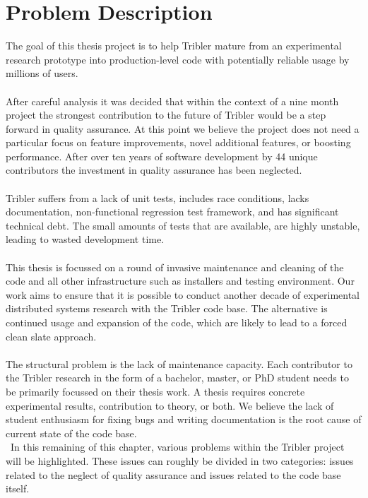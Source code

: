 \chapter{Problem Description}

The goal of this thesis project is to help Tribler mature from an experimental research prototype into production-level code with potentially reliable usage by millions of users.\\\\
After careful analysis it was decided that within the context of a nine month project the strongest contribution to the future of Tribler would be a step forward in quality assurance. At this point we believe the project does not need a particular focus on feature improvements, novel additional features, or boosting performance. After over ten years of software development by 44 unique contributors the investment in quality assurance has been neglected.\\\\
Tribler suffers from a lack of unit tests, includes race conditions, lacks documentation, non-functional regression test framework, and has significant technical debt. The small amounts of tests that are available, are highly unstable, leading to wasted development time.\\\\
This thesis is focussed on a round of invasive maintenance and cleaning of the code and all other infrastructure such as installers and testing environment. Our work aims to ensure that it is possible to conduct another decade of experimental distributed systems research with the Tribler code base. The alternative is continued usage and expansion of the code, which are likely to lead to a forced clean slate approach.\\\\
The structural problem is the lack of maintenance capacity. Each contributor to the Tribler research in the form of a bachelor, master, or PhD student needs to be primarily focussed on their thesis work. A thesis requires concrete experimental results, contribution to theory, or both. We believe the lack of student enthusiasm for fixing bugs and writing documentation is the root cause of current state of the code base.\\\
In this remaining of this chapter, various problems within the Tribler project will be highlighted. These issues can roughly be divided in two categories: issues related to the neglect of quality assurance and issues related to the code base itself.



